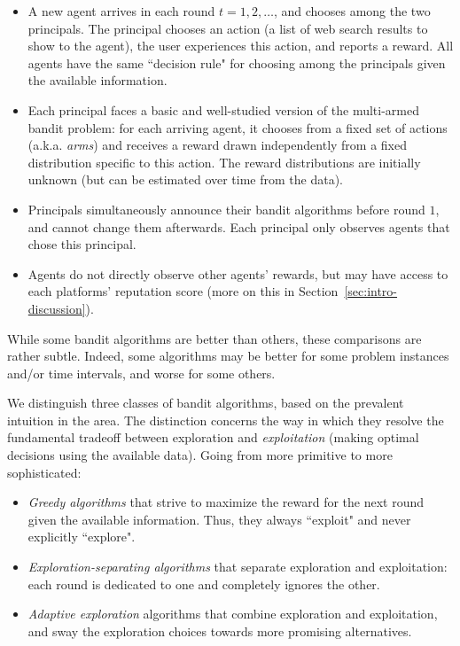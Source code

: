 \begin{itemize}

\item A new agent arrives in each round $t=1,2, \ldots$, and chooses among the two principals. The principal chooses an action (\eg a list of web search results to show to the agent), the user experiences this action, and reports a reward. All agents have the same ``decision rule" for choosing among the principals given the available information.

\item Each principal faces a basic and well-studied version of the multi-armed bandit problem: for each arriving agent, it chooses from a fixed set of actions  (a.k.a. \emph{arms}) and receives a reward drawn independently from a fixed distribution specific to this action. The reward distributions are initially unknown (but can be estimated over time from the data).

\item Principals simultaneously announce their bandit algorithms before round $1$, and cannot change them afterwards.
    Each principal only observes agents that chose this principal.
    
\item Agents do not directly observe other agents' rewards, but may have access to each platforms' reputation score (more on this in    Section~\ref{sec:intro-discussion}).
\end{itemize}
    
While some bandit algorithms are better than others, these comparisons are rather subtle. Indeed, some algorithms may be better for some problem instances and/or time intervals, and worse for some others.

We distinguish three classes of bandit algorithms, based on 
the prevalent intuition in the area. The distinction concerns the way in which they resolve the fundamental tradeoff between  exploration and \emph{exploitation} (making optimal decisions using the available data). Going from more primitive to more sophisticated:

\begin{itemize}
\item \emph{Greedy algorithms} that strive to maximize the reward for the next round given the available information. Thus, they always ``exploit" and never explicitly ``explore".


\item \emph{Exploration-separating algorithms}
 that separate exploration and exploitation: each round is dedicated to one and completely ignores the other.
     
\item \emph{Adaptive exploration} algorithms that combine exploration and exploitation, and sway the exploration choices towards more promising alternatives.
\end{itemize}

